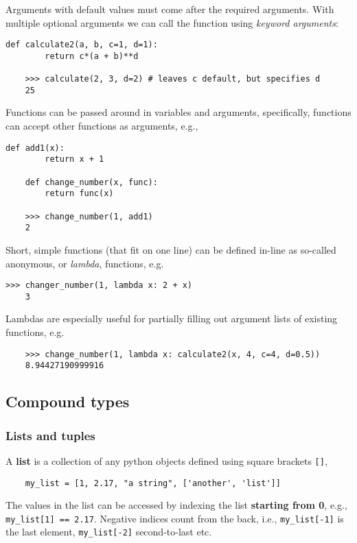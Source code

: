 Arguments with default values must come after the required arguments. With multiple optional arguments we can call the function using \emph{keyword arguments}:
\begin{lstlisting}[caption=Optional and keyword arguments.]
    def calculate2(a, b, c=1, d=1):
        return c*(a + b)**d

    >>> calculate(2, 3, d=2) # leaves c default, but specifies d
    25
\end{lstlisting}

Functions can be passed around in variables and arguments, specifically, functions can accept other functions as arguments, e.g.,
\begin{lstlisting}[caption=Higher order functions.]
    def add1(x):
        return x + 1

    def change_number(x, func):
        return func(x)

    >>> change_number(1, add1)
    2
\end{lstlisting}

Short, simple functions (that fit on one line) can be defined in-line as so-called anonymous, or \emph{lambda}, functions, e.g.
\begin{lstlisting}[caption=Lambda functions.]
    >>> changer_number(1, lambda x: 2 + x)
    3
\end{lstlisting}
Lambdas are especially useful for partially filling out argument lists of existing functions, e.g.
\begin{lstlisting}
    >>> change_number(1, lambda x: calculate2(x, 4, c=4, d=0.5))
    8.94427190999916
\end{lstlisting}

\subsection{Compound types}

\subsubsection{Lists and tuples}
A \textbf{list} is a collection of any python objects defined using square brackets \verb|[]|,
\begin{lstlisting}
    my_list = [1, 2.17, "a string", ['another', 'list']]
\end{lstlisting}
The values in the list can be accessed by indexing the list \textbf{starting from 0}, e.g., \verb|my_list[1] == 2.17|. Negative indices count from the back, i.e., \verb|my_list[-1]| is the last element, \verb|my_list[-2]| second-to-last etc.

